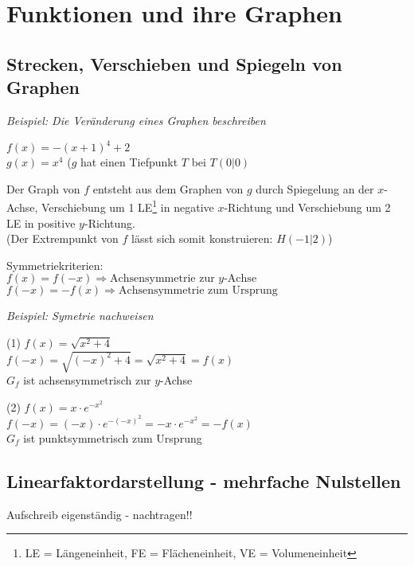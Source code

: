 \chapter{Funktionen und ihre Graphen}
\section{Strecken, Verschieben und Spiegeln von Graphen}
\textit{Beispiel: Die Veränderung eines Graphen beschreiben}

$f(x) = -(x + 1)^4 + 2$ \\
$g(x) = x^4$ ($g$ hat einen Tiefpunkt $T$ bei $T(0|0)$

Der Graph von $f$ entsteht aus dem Graphen von $g$ durch Spiegelung an der $x$-Achse, Verschiebung um 1 LE\footnote{LE = Längeneinheit, FE = Flächeneinheit, VE = Volumeneinheit} in negative $x$-Richtung und Verschiebung um 2 LE in positive $y$-Richtung.\\
(Der Extrempunkt von $f$ lässt sich somit konstruieren: $H(-1 | 2)$)

\begin{definition}
    Symmetriekriterien: \\
    $f(x) = f(-x) \Longrightarrow \text{Achsensymmetrie zur $y$-Achse}$ \\ 
   $ f(-x) = -f(x) \Longrightarrow \text{Achsensymmetrie zum Ursprung}$ 
\end{definition}

\textit{Beispiel: Symetrie nachweisen}

\begin{minipage}{0.5\textwidth}
    (1) $f(x) = \sqrt{x^2 + 4}$ \\
    $f(-x) = \sqrt{(-x)^2 +4} = \sqrt{x^2 + 4} = f(x)$ \\ $G_f$ ist achsensymmetrisch zur $y$-Achse
\end{minipage}
\begin{minipage}{0.5\textwidth}
    (2) $f(x) = x \cdot e^{-x^2}$ \\
    $f(-x) = (-x) \cdot e^{-(-x)^2} = -x \cdot e^{-x^2} = -f(x)$ \\ $G_f$ ist punktsymmetrisch zum Ursprung
\end{minipage}

\section{Linearfaktordarstellung - mehrfache Nulstellen}

Aufschreib eigenständig - nachtragen!!

